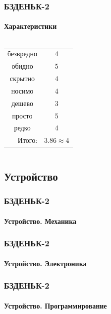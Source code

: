 \begin{frame}
    \frametitle{БЗДЕНЬК-2}
    \framesubtitle{Характеристики}
    
    \begin{columns}
            \begin{center}
                \begin{tabular}{c|c}
                    \hline
                    безвредно                   & 4 \\
                    обидно                      & 5 \\
                    скрытно                     & 4 \\
                    носимо                      & 4 \\
                    дешево                      & 3 \\
                    просто                      & 5 \\ 
                    редко                       & 4 \\ \hline
                    \multicolumn{1}{r|}{Итого:} & $3.86\approx 4$ \\
                \end{tabular}
            \end{center}
    \end{columns}    
\end{frame}


\subsection{Устройство}

\begin{frame}
    \frametitle{БЗДЕНЬК-2}
    \framesubtitle{Устройство. Механика}
\end{frame}

\begin{frame}
    \frametitle{БЗДЕНЬК-2}
    \framesubtitle{Устройство. Электроника}
\end{frame}

\begin{frame}
    \frametitle{БЗДЕНЬК-2}
    \framesubtitle{Устройство. Программирование}
\end{frame}

